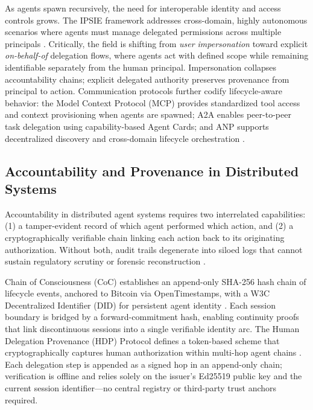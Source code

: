 As agents spawn recursively, the need for interoperable identity and access controls grows. The IPSIE framework addresses cross-domain, highly autonomous scenarios where agents must manage delegated permissions across multiple principals \cite{ipsiene2025}. Critically, the field is shifting from \emph{user impersonation} toward explicit \emph{on-behalf-of} delegation flows, where agents act with defined scope while remaining identifiable separately from the human principal. Impersonation collapses accountability chains; explicit delegated authority preserves provenance from principal to action. Communication protocols further codify lifecycle-aware behavior: the Model Context Protocol (MCP) provides standardized tool access and context provisioning when agents are spawned; A2A enables peer-to-peer task delegation using capability-based Agent Cards; and ANP supports decentralized discovery and cross-domain lifecycle orchestration \cite{protocols2025}.

\subsection{Accountability and Provenance in Distributed Systems}

Accountability in distributed agent systems requires two interrelated capabilities: (1) a tamper-evident record of which agent performed which action, and (2) a cryptographically verifiable chain linking each action back to its originating authorization. Without both, audit trails degenerate into siloed logs that cannot sustain regulatory scrutiny or forensic reconstruction \cite{vap2026, trusttrack2025}.

Chain of Consciousness (CoC) establishes an append-only SHA-256 hash chain of lifecycle events, anchored to Bitcoin via OpenTimestamps, with a W3C Decentralized Identifier (DID) for persistent agent identity \cite{chainofconsciousness2026}. Each session boundary is bridged by a forward-commitment hash, enabling continuity proofs that link discontinuous sessions into a single verifiable identity arc. The Human Delegation Provenance (HDP) Protocol defines a token-based scheme that cryptographically captures human authorization within multi-hop agent chains \cite{hdp2026}. Each delegation step is appended as a signed hop in an append-only chain; verification is offline and relies solely on the issuer's Ed25519 public key and the current session identifier—no central registry or third-party trust anchors required.

